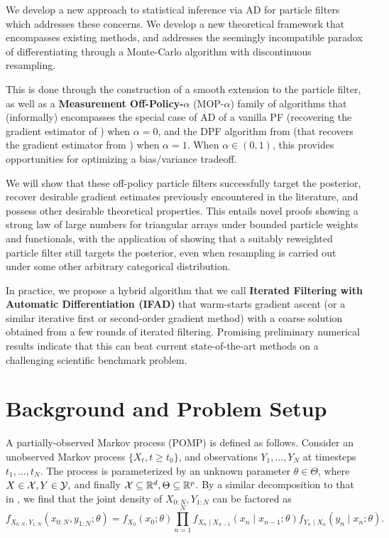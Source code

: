 \documentclass{article}
\begin{document}
We develop a new approach to statistical inference via AD for particle filters which addresses these concerns. We develop a new theoretical framework that encompasses existing methods, and addresses the seemingly incompatible paradox of differentiating through a Monte-Carlo algorithm with discontinuous resampling.

This is done through the construction of a smooth extension to the particle filter, as well as a \textbf{Measurement Off-Policy-$\alpha$} (MOP-$\alpha$) family of algorithms that (informally) encompasses the special case of AD of a vanilla PF (recovering the gradient estimator of \citet{blei2018vsmc}) when $\alpha=0$, and the DPF algorithm from \citet{scibior2021dpf} (that recovers the gradient estimator from \citet{poyiadjis11}) when $\alpha=1$. When $\alpha \in (0,1)$, this provides opportunities for optimizing a bias/variance tradeoff. 

We will show that these off-policy particle filters successfully target the posterior, recover desirable gradient estimates previously encountered in the literature, and possess other desirable theoretical properties. This entails novel proofs showing a strong law of large numbers for triangular arrays under bounded particle weights and functionals, with the application of showing that a suitably reweighted particle filter still targets the posterior, even when resampling is carried out under some other arbitrary categorical distribution.


In practice, we propose a hybrid algorithm that we call \textbf{Iterated Filtering with Automatic Differentiation (IFAD)} that warm-starts gradient ascent (or a similar iterative first or second-order gradient method) with a coarse solution obtained from a few rounds of iterated filtering. Promising preliminary numerical results indicate that this can beat current state-of-the-art methods on a challenging scientific benchmark problem.


\section{Background and Problem Setup}
A partially-observed Markov process (POMP) is defined as follows. Consider an unobserved Markov process $\{X_t, t \geq t_0\}$, and observations $Y_1,...,Y_N$ at timesteps $t_1,..., t_N$. The process is parameterized by an unknown parameter $\theta \in \Theta$, where $X \in {\mathcal{X}}, Y \in {\mathcal{Y}},$ and finally ${\mathcal{X}} \subseteq \mathbb{R}^d, \Theta \subseteq \mathbb{R}^p$. By a similar decomposition to that in \citet{doucet2009tutorial}, we find that the joint density of $X_{0:N}, Y_{1:N}$ can be factored as
$$f_{X_{0: N}, Y_{1: N}}\left(x_{0: N}, y_{1: N} ; \theta\right)=f_{X_0}\left(x_0 ; \theta\right) \prod_{n=1}^N f_{X_n \mid X_{n-1}}\left(x_n \mid x_{n-1} ; \theta\right) f_{Y_n \mid X_n}\left(y_n \mid x_n ; \theta\right).$$
\end{document}
